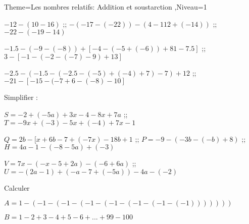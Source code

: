 \documentclass[a4paper,12pt]{article}
\begin{document}
\begin{Maquette}[Fiche]{Theme=Les nombres relatifs: Addition et soustarction ,Niveau=1}
\begin{exercice}
$-12-(10-16)$ ;; $ -(-17-(-22))-(4-112+(-14))$ ;; $-22-(-19-14)$

$-1.5-(-9-(-8))+[-4-(-5+(-6))+81-7.5]$ ;;
$3-[-1-(-2-(-7)-9)+13]$

$-2.5-(-1.5-(-2.5-(-5)+(-4)+7)-7)+12$ ;;
$-21-[-15-(-7+6-(-8)-10]$
\end{exercice}

\begin{exercice}
Simplifier :

$S=-2+(-5a)+3x-4-8x+7a$ ;; $T=-9x+(-3)-5x+(-4)+7x-1$

$Q=2b-[x+6b-7+(-7x)-18b+1$ ;; $P=-9-(-3b-(-b)+8)$ ;; $H=4a-1-(-8-5a)+(-3)$

$V=7x-(-x-5+2a)-(-6+6a)$ ;; $U=-(2a-1)+(-a-7+(-5a))-4a-(-2)$
\end{exercice}

\begin{exercice}
Calculer

$A=1-(-1-(-1-(-1-(-1-(-1-(-1-(-1)))))))$

$B=1-2+3-4+5-6+...+99-100$
\end{exercice}
\end{Maquette}
\end{document}
